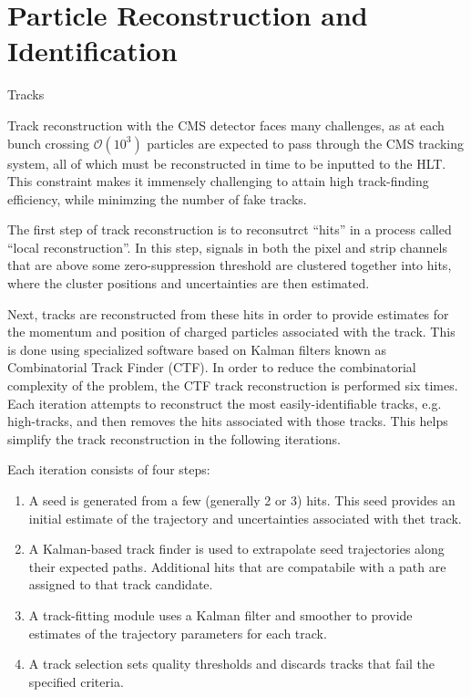 \chapter{Particle Reconstruction and Identification}
\label{chap:reco_id}
\begin{section}{Tracks}

Track reconstruction with the CMS detector faces many challenges, as at each bunch crossing $\mathcal{O}(10^3)$ particles are expected to pass through the CMS tracking system, all of which must be reconstructed in time to be inputted to the HLT.
This constraint makes it immensely challenging to attain high track-finding efficiency, while minimzing the number of fake tracks.

The first step of track reconstruction is to reconsutrct ``hits'' in a process called ``local reconstruction''.
In this step, signals in both the pixel and strip channels that are above some zero-suppression threshold are clustered together into hits, where the cluster positions and uncertainties are then estimated.

Next, tracks are reconstructed from these hits in order to provide estimates for the momentum and position of charged particles associated with the track.
This is done using specialized software based on Kalman filters known as Combinatorial Track Finder (CTF).
In order to reduce the combinatorial complexity of the problem, the CTF track reconstruction is performed six times. 
Each iteration attempts to reconstruct the most easily-identifiable tracks, e.g. high-\pT tracks, and then removes the hits associated with those tracks.
This helps simplify the track reconstruction in the following iterations.

Each iteration consists of four steps:
\begin{enumerate}
\item A seed is generated from a few (generally 2 or 3) hits. 
This seed provides an initial estimate of the trajectory and uncertainties associated with thet track.
\item A Kalman-based track finder is used to extrapolate seed trajectories along their expected paths. Additional hits that are compatabile with a path are assigned to that track candidate.
\item A track-fitting module uses a Kalman filter and smoother to provide estimates of the trajectory parameters for each track.
\item A track selection sets quality thresholds and discards tracks that fail the specified criteria.
\end{enumerate}


\end{section}
